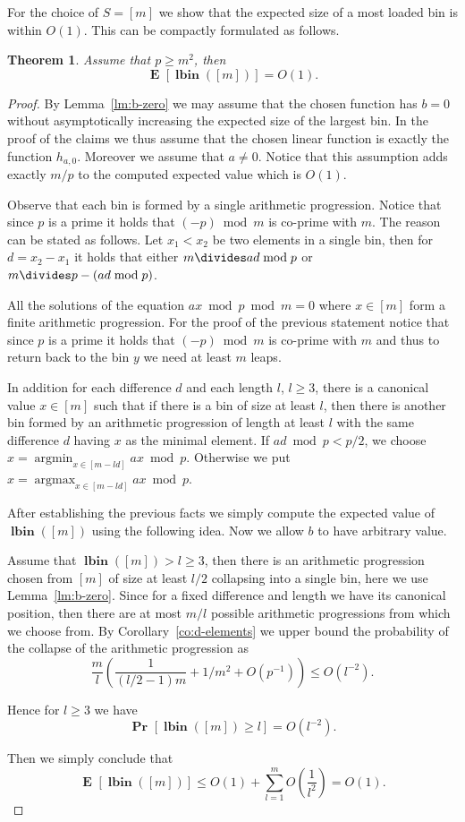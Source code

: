 \documentclass{article}
\newcommand{\vlbin}[1]{\operatorname{\mathbf{lbin}}({#1})}
\newcommand{\probs}[2]{\operatorname{\mathbf{Pr}}_{{#1}}\left[{#2}\right]}
\newcommand{\prob}[1]{\probs{}{#1}}
\newcommand{\expects}[2]{\operatorname{\mathbf{E}}_{{#1}}\left[{#2}\right]}
\newcommand{\expect}[1]{\expects{}{#1}}
\newtheorem{theorem}{Theorem}
\begin{document}
For the choice of $S = [m]$ we show that the expected size of a most loaded bin is within $O(1)$. 
This can be compactly formulated as follows.
\begin{theorem}
\label{thm:interval-constant}
Assume that $p \geq m^2$, then
\[
\expect{\vlbin{[m]}} = O(1).
\]
\end{theorem}
\begin{proof}
By Lemma~\ref{lm:b-zero} we may assume that the chosen function has $b = 0$ without asymptotically increasing the expected size of the largest bin. In the proof of the claims we thus assume that the chosen linear function is exactly the function $h_{a, 0}$. Moreover we assume that $a \neq 0$. Notice that this assumption adds exactly $m/p$ to the computed expected value which is $O(1)$.

Observe that each bin is formed by a single arithmetic progression. Notice that since $p$ is a prime it holds that $(-p) \bmod m$ is co-prime with $m$.
The reason can be stated as follows.
Let $x_1 < x_2$ be two elements in a single bin, then for $d = x_2 - x_1$ it holds that either $m \divides ad \bmod p$ or $m \divides p - (ad \bmod p)$.

All the solutions of the equation $ax \bmod p \bmod m = 0$ where $x \in [m]$ form a finite arithmetic progression.
For the proof of the previous statement notice that since $p$ is a prime it holds that $(-p) \bmod m$ is co-prime with $m$ and thus to return back to the bin $y$ we need at least $m$ leaps. 

In addition for each difference $d$ and each length $l$, $l \geq 3$, there is a canonical value $x \in [m]$ such that if there is a bin of size at least $l$, then there is another bin formed by an arithmetic progression of length at least $l$ with the same difference $d$ having $x$ as the minimal element. If $ad \bmod p < p/2$, we choose $x = \operatorname{argmin}_{x \in [m - ld]} ax \bmod p$. Otherwise we put $x = \operatorname{argmax}_{x \in [m - ld]} ax \bmod p$.

After establishing the previous facts we simply compute the expected value of $\vlbin{[m]}$ using the following idea. Now we allow $b$ to have arbitrary value.

Assume that $\vlbin{[m]} > l \geq 3$, then there is an arithmetic progression chosen from $[m]$ of size at least $l/2$ collapsing into a single bin, here we use Lemma~\ref{lm:b-zero}. Since for a fixed difference and length we have its canonical position, then there are at most $m/l$ possible arithmetic progressions from which we choose from. By Corollary~\ref{co:d-elements} we upper bound the probability of the collapse of the arithmetic progression as 
\[
\frac{m}{l} \left(\frac{1}{(l/2 - 1)m} + 1/m^2 + O(p^{-1})\right) \leq O(l^{-2}).
\]


Hence for $l \geq 3$ we have
\[
\prob{\vlbin{[m]} \geq l} = O(l^{-2}).
\]

Then we simply conclude that
\[
\expect{\vlbin{[m]}} \leq O(1) + \sum_{l = 1}^m O\left(\frac{1}{l^2}\right) = O(1).
\]

\end{proof}
\end{document}
